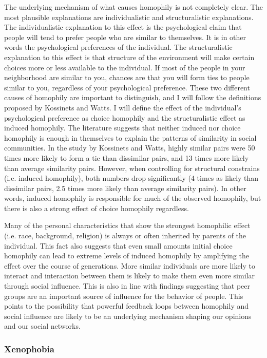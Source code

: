 \documentclass[9pt,twocolumn,twoside]{ilcss}
\begin{document}
The underlying mechanism of what causes homophily is not completely clear. The most plausible explanations are individualistic and structuralistic explanations. 
The individualistic explanation to this effect is the psychological claim that people will tend to prefer people who are similar to themselves. It is in other words the psychological preferences of the individual. 
The structuralistic explanation to this effect is that structure of the environment will make certain choices more or less available to the individual. 
If most of the people in your neighborhood are similar to you, chances are that you will form ties to people similar to you, regardless of your psychological preference. 
These two different causes of homophily are important to distinguish, and I will follow the definitions proposed by Kossinets and Watts. 
I will define the effect of the individual's psychological preference as choice homophily and the structuralistic effect as induced homophily. 
The literature suggests that neither induced nor choice homophily is enough in themselves to explain the patterns of similarity in social communities.
In the study by Kossinets and Watts, highly similar pairs were 50 times more likely to form a tie than dissimilar pairs, and 13 times more likely than average similarity pairs. However, when controlling for structural constrains (i.e. induced homophily), both numbers drop significantly (4 times as likely than dissimilar pairs, 2.5 times more likely than average similarity pairs).
In other words, induced homophily is responsible for much of the observed homophily, but there is also a strong effect of choice homophily regardless. 

Many of the personal characteristics that show the strongest homophilic effect (i.e. race, background, religion) is always or often inherited by parents of the individual.
This fact also suggests that even small amounts initial choice homophily can lead to extreme levels of induced homophily by amplifying the effect over the course of generations. More similar individuals are more likely to interact and interaction between them is likely to make them even more similar through social influence. 
This is also in line with findings suggesting that peer groups are an important source of influence for the behavior of people. 
This points to the possibility that powerful feedback loops between homophily and social influence are likely to be an underlying mechanism shaping our opinions and our social networks. 

\subsubsection{Xenophobia}
\end{document}

